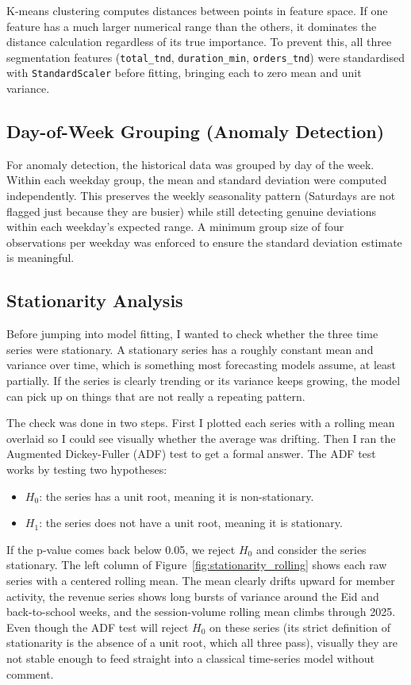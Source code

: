 \documentclass[12pt, a4paper]{report}
\begin{document}
K-means clustering computes distances between points in feature space. If one
feature has a much larger numerical range than the others, it dominates the
distance calculation regardless of its true importance. To prevent this, all
three segmentation features (\texttt{total\_tnd}, \texttt{duration\_min},
\texttt{orders\_tnd}) were standardised with \texttt{StandardScaler} before
fitting, bringing each to zero mean and unit variance.

\subsection{Day-of-Week Grouping (Anomaly Detection)}

For anomaly detection, the historical data was grouped by day of the week. Within
each weekday group, the mean and standard deviation were computed independently.
This preserves the weekly seasonality pattern (Saturdays are not flagged just
because they are busier) while still detecting genuine deviations within each
weekday's expected range. A minimum group size of four observations per weekday
was enforced to ensure the standard deviation estimate is meaningful.

\subsection{Stationarity Analysis}

Before jumping into model fitting, I wanted to check whether the three time series
were stationary. A stationary series has a roughly constant mean and variance over
time, which is something most forecasting models assume, at least partially.
If the series is clearly trending or its variance keeps growing, the model can pick
up on things that are not really a repeating pattern.

The check was done in two steps. First I plotted each series with a rolling mean
overlaid so I could see visually whether the average was drifting. Then I ran the
Augmented Dickey-Fuller (ADF) test to get a formal answer. The ADF test works by
testing two hypotheses:

\begin{itemize}
  \item $H_0$: the series has a unit root, meaning it is non-stationary.
  \item $H_1$: the series does not have a unit root, meaning it is stationary.
\end{itemize}

If the p-value comes back below 0.05, we reject $H_0$ and consider the series
stationary. The left column of Figure~\ref{fig:stationarity_rolling} shows
each raw series with a centered rolling mean. The mean clearly drifts upward
for member activity, the revenue series shows long bursts of variance around
the Eid and back-to-school weeks, and the session-volume rolling mean climbs
through 2025. Even though the ADF test will reject $H_0$ on these series
(its strict definition of stationarity is the absence of a unit root, which
all three pass), visually they are not stable enough to feed straight into a
classical time-series model without comment.
\end{document}
